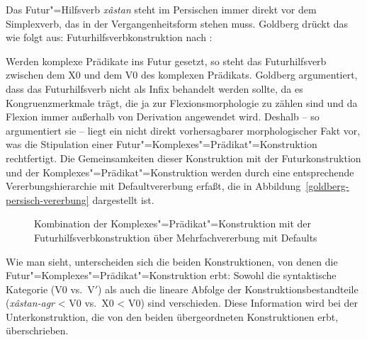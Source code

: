 Das Futur"=Hilfsverb \emph{x{\^a}stan} steht im Persischen immer direkt vor dem
Simplexverb, das in der Vergangenheitsform stehen muss. Goldberg drückt das wie folgt aus:
\eas
Futurhilfsverbkonstruktion nach :\\
\zs
Werden komplexe Prädikate ins Futur gesetzt, so steht das Futurhilfsverb zwischen dem X0
und dem V0 des komplexen Prädikats. Goldberg argumentiert, dass das Futurhilfsverb nicht als
Infix behandelt werden sollte, da es Kongruenzmerkmale trägt, die ja zur Flexionsmorphologie
zu zählen sind und da Flexion immer außerhalb von Derivation angewendet wird. Deshalb -- so argumentiert
sie -- liegt ein nicht direkt vorhersagbarer morphologischer Fakt vor, was die Stipulation einer
Futur"=Komplexes"=Prädikat"=Konstruktion rechtfertigt. 
Die Gemeinsamkeiten dieser Konstruktion
mit der Futurkonstruktion und der Komplexes"=Prädikat"=Konstruktion werden durch eine
entsprechende Vererbungshierarchie mit Defaultvererbung erfaßt, die in Abbildung~\vref{goldberg-persisch-vererbung}
dargestellt ist.
\begin{figure}
\caption{\label{goldberg-persisch-vererbung}%
Kombination der Komplexes"=Prädikat"=Konstruktion mit der Futurhilfsverbkonstruktion über Mehrfachvererbung mit Defaults}
\end{figure}
Wie man sieht, unterscheiden sich die beiden Konstruktionen, von denen die Futur"=Komplexes"=Prädikat"=Konstruktion
erbt: Sowohl die syntaktische Kategorie (V0 vs.\ V$'$)
als auch die lineare Abfolge der Konstruktionsbestandteile (\emph{x{\^a}stan-agr}  <  V0 vs.\ X0  <  V0)
sind verschieden. Diese Information wird bei der Unterkonstruktion, die von den beiden übergeordneten
Konstruktionen erbt, überschrieben.

